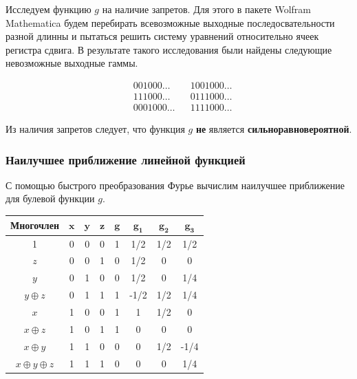 \documentclass[a4paper,12pt]{article}
\theoremstyle{definition}
\begin{document}
	Исследуем функцию $g$ на наличие запретов. Для этого в пакете Wolfram Mathematica будем перебирать всевозможные выходные последосвательности разной длинны и пытаться решить систему уравнений относительно ячеек регистра сдвига. В результате такого исследования были найдены следующие невозможные выходные гаммы.
	
	\begin{align*}
		&001000\dots  & &1001000\dots\\
		&111000\dots  & &0111000\dots\\
		&0001000\dots & &1111000\dots 
	\end{align*}

	Из наличия запретов следует, что функция $g$ \textbf{не} является \textbf{сильноравновероятной}.
	

	\subsubsection{Наилучшее приближение линейной функцией} \label{Наилучшее приближение линейной функцией}
	
	С помощью быстрого преобразования Фурье вычислим наилучшее приближение для булевой функции $g$.
	
	\begin{table}[h!]
		\begin{center}
			\begin{tabular}{|c|c|c|c||c||c|c|c|}
				\hline
				\textbf{Многочлен} & $ \pmb{x} $ & $ \pmb{y} $ & $ \pmb{z} $ & $ \pmb{g} $ & $ \pmb{g_1} $ & $ \pmb{g_2} $ & $ \pmb{g_3} $ \\ \hline
					1 & 0 & 0 & 0 & 1 &  1/2 &  1/2 &  1/2 \\ \hline
				  $z$ & 0 & 0 & 1 & 0 &  1/2 &    0 &    0 \\ \hline
			   	  $y$ & 0 & 1 & 0 & 0 &  1/2 &    0 &  1/4 \\ \hline
		 $y \oplus z$ & 0 & 1 & 1 & 1 & -1/2 &  1/2 &  1/4 \\ \hline
				  $x$ & 1 & 0 & 0 & 1 &    1 &  1/2 &    0 \\ \hline
		 $x \oplus z$ & 1 & 0 & 1 & 1 &    0 &    0 &    0 \\ \hline
		 $x \oplus y$ & 1 & 1 & 0 & 0 &    0 &  1/2 & -1/4 \\ \hline
$x \oplus y \oplus z$ & 1 & 1 & 1 & 0 &    0 &    0 &  1/4 \\ \hline
			\end{tabular}
		\end{center}
	\end{table}
\end{document}
